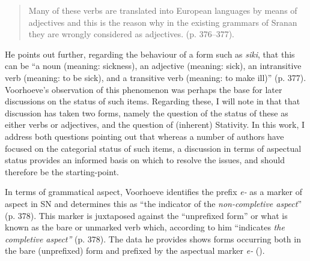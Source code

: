 \begin{quote}
Many of these verbs are translated into European languages by means of
adjectives and this is the reason why in the existing grammars of
Sranan they are wrongly considered as adjectives. (p. 376--377).
\end{quote}

He points out further, regarding the behaviour of a form such as
\textit{siki}, that this can be “a noun (meaning: sickness), an
adjective (meaning: sick), an intransitive verb (meaning: to be sick),
and a transitive verb (meaning: to make ill)” (p. 377).  Voorhoeve’s
observation of this phenomenon was perhaps the base for later
discussions on the status of such items.  Regarding these, I will note
in  that that discussion has taken two forms, namely the
question of the status of these as either verbs or adjectives, and the
question of (inherent) Stativity.  In this work, I address both
questions pointing out that whereas a number of authors have focused
on the categorial status of such items, a discussion in terms of
aspectual status provides an informed basis on which to resolve the
issues, and should therefore be the starting-point.

In terms of grammatical aspect, Voorhoeve identifies the prefix
\textit{e-} as a marker of aspect in SN and determines this as “the
indicator of the \textit{non-completive aspect}” (p. 378).  This
marker is juxtaposed against the “unprefixed form” or what is known as
the bare or unmarked verb which, according to him “indicates
\textit{the completive aspect”} (p. 378).  The data he provides shows
forms occurring both in the bare (unprefixed) form and prefixed by the
aspectual marker \textit{e-} ().


